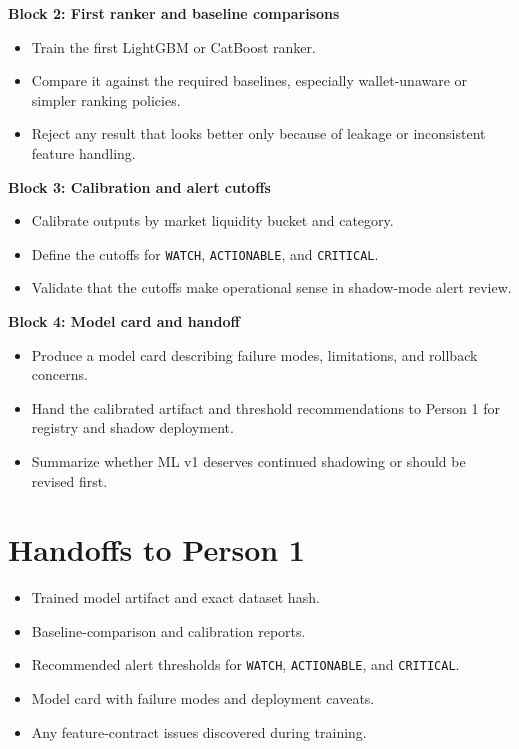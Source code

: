 \documentclass{article}
\begin{document}
\textbf{Block 2: First ranker and baseline comparisons}
\begin{itemize}
\item Train the first LightGBM or CatBoost ranker.
\item Compare it against the required baselines, especially wallet-unaware or simpler ranking policies.
\item Reject any result that looks better only because of leakage or inconsistent feature handling.
\end{itemize}

\textbf{Block 3: Calibration and alert cutoffs}
\begin{itemize}
\item Calibrate outputs by market liquidity bucket and category.
\item Define the cutoffs for \texttt{WATCH}, \texttt{ACTIONABLE}, and \texttt{CRITICAL}.
\item Validate that the cutoffs make operational sense in shadow-mode alert review.
\end{itemize}

\textbf{Block 4: Model card and handoff}
\begin{itemize}
\item Produce a model card describing failure modes, limitations, and rollback concerns.
\item Hand the calibrated artifact and threshold recommendations to Person 1 for registry and shadow deployment.
\item Summarize whether ML v1 deserves continued shadowing or should be revised first.
\end{itemize}

\section*{Handoffs to Person 1}
\begin{itemize}
\item Trained model artifact and exact dataset hash.
\item Baseline-comparison and calibration reports.
\item Recommended alert thresholds for \texttt{WATCH}, \texttt{ACTIONABLE}, and \texttt{CRITICAL}.
\item Model card with failure modes and deployment caveats.
\item Any feature-contract issues discovered during training.
\end{itemize}
\end{document}

